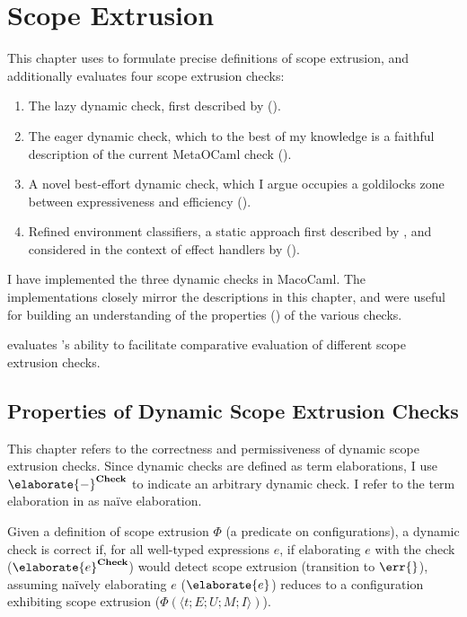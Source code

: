 \newcommand{\scoped}[2][\Theta]{\textsf{Scoped}_{{#1}, {#2}}}

\chapter{Scope Extrusion}\label{chapter:scope-extrusion}
This chapter uses \calculusName{} to formulate precise definitions of scope extrusion, and additionally evaluates four scope extrusion checks: 
\begin{enumerate}
  \item The lazy dynamic check, first described by \citet{kiselyov-14} ().
  \item The eager dynamic check, which to the best of my knowledge is a faithful description of the current MetaOCaml check \citep{kiselyov-16} ().
  \item A novel best-effort dynamic check, which I argue occupies a goldilocks zone between expressiveness and efficiency ().
  \item Refined environment classifiers, a static approach first described by \citet{kiselyov-16}, and considered in the context of effect handlers by \citet{isoda-24} ().
\end{enumerate}
I have implemented the three dynamic checks in MacoCaml. The implementations closely mirror the descriptions in this chapter, and were useful for building an understanding of the properties () of the various checks. 

 evaluates \calculusName{}'s ability to facilitate comparative evaluation of different scope extrusion checks. 
\section{Properties of Dynamic Scope Extrusion Checks}\label{section:properties}
This chapter refers to the correctness and permissiveness of dynamic scope extrusion checks. Since dynamic checks are defined as term elaborations, I use $\elaborate{-}^{\textbf{Check}}$ to indicate an arbitrary dynamic check. I refer to the term elaboration in  as naïve elaboration.

Given a definition of scope extrusion $\Phi$ (a predicate on configurations), a dynamic check is correct if, for all well-typed \sourceLang{} expressions $e$, if elaborating $e$ with the check ($\elaborate{e}^{\textbf{Check}}$) would detect scope extrusion (transition to $\err{}$), assuming naïvely elaborating $e$ ($\elaborate{e}$) reduces to a configuration exhibiting scope extrusion ($\Phi(\langle t;E;U;M;I\rangle)$).

